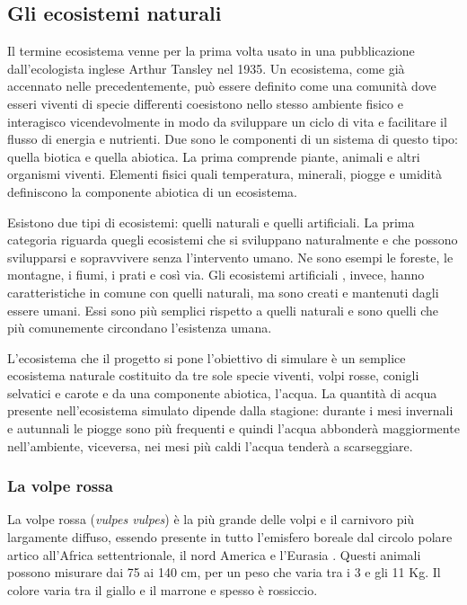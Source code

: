 \documentclass[11pt]{article}
\begin{document}
\subsection{Gli ecosistemi naturali}
Il termine ecosistema venne per la prima volta usato in una pubblicazione dall'ecologista inglese Arthur Tansley nel 1935.\cite{WikiEcosystem}
Un ecosistema\cite{Vedantu}, come già accennato nelle precedentemente, può essere definito come una comunità dove esseri viventi di specie differenti coesistono nello stesso ambiente fisico e interagisco vicendevolmente in modo da sviluppare un ciclo di vita e facilitare il flusso di energia e nutrienti. 
Due sono le componenti di un sistema di questo tipo: quella biotica e quella abiotica. La prima comprende piante, animali e altri organismi viventi. Elementi fisici quali temperatura, minerali, piogge e umidità definiscono la componente abiotica di un ecosistema. 

Esistono due tipi di ecosistemi: quelli naturali e quelli artificiali. La prima categoria riguarda quegli ecosistemi che si sviluppano naturalmente e che possono svilupparsi e sopravvivere senza l'intervento umano. Ne sono esempi le foreste, le montagne, i fiumi, i prati e così via. Gli ecosistemi artificiali \cite{ArtificialEcosystems}, invece, hanno caratteristiche in comune con quelli naturali, ma sono creati e mantenuti dagli essere umani. Essi sono più semplici rispetto a quelli naturali e sono quelli che più comunemente circondano l'esistenza umana. 

L'ecosistema che il progetto si pone l'obiettivo di simulare è un semplice ecosistema naturale costituito da tre sole specie viventi, volpi rosse, conigli selvatici e carote e da una componente abiotica, l'acqua. La quantità di acqua presente nell'ecosistema simulato dipende dalla stagione: durante i mesi invernali e autunnali le piogge sono più frequenti e quindi l'acqua abbonderà maggiormente nell'ambiente, viceversa, nei mesi più caldi l'acqua tenderà a scarseggiare. 

\subsubsection{La volpe rossa}
\label{volpe}
La volpe rossa (\emph{vulpes vulpes}) è la più grande delle volpi e il carnivoro più largamente diffuso, essendo presente in tutto l'emisfero boreale dal circolo polare artico all'Africa settentrionale, il nord America e l'Eurasia \cite{WikiVolpe}.
Questi animali possono misurare dai 75 ai 140 cm, per un peso che varia tra i 3 e gli 11 Kg. Il colore varia tra il giallo e il marrone e spesso è rossiccio. 
\end{document}
